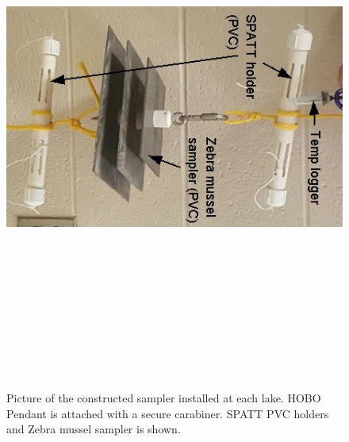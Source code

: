 \begin{figure}[!h]
\centering
\includegraphics[width=\textwidth, height=18cm]{figures/samplers}
\caption{Picture of the constructed sampler installed at each lake. HOBO Pendant is attached with a secure carabiner. SPATT PVC holders and Zebra mussel sampler is shown.}
\label{fig:samplerr}
\end{figure}


